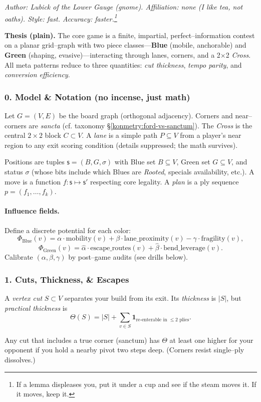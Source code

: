 \documentclass[11pt]{article}
\begin{document}
\begin{itemize}
\noindent\textit{Author: Lubick of the Lower Gauge (gnome). Affiliation: none (I like tea, not oaths). Style: fast. Accuracy: faster.\footnote{If a lemma displeases you, put it under a cup and see if the steam moves it. If it moves, keep it.}}

\medskip
\noindent\textbf{Thesis (plain).} The core game is a finite, impartial, perfect–information contest on a planar grid–graph with two piece classes—\textbf{Blue} (mobile, anchorable) and \textbf{Green} (shaping, evasive)—interacting through lanes, corners, and a 2\(\times\)2 \emph{Cross}. All meta patterns reduce to three quantities: \emph{cut thickness}, \emph{tempo parity}, and \emph{conversion efficiency}.

\subsubsection{0. Model \& Notation (no incense, just math)}
Let \(G=(V,E)\) be the board graph (orthogonal adjacency). Corners and near–corners are \emph{sancta} (cf. taxonomy \S\ref{konmetry:ford-vs-sanctum}). The \emph{Cross} is the central \(2\times2\) block \(C\subset V\). A \emph{lane} is a simple path \(P\subseteq V\) from a player’s near region to any exit scoring condition (details suppressed; the math survives). 

Positions are tuples \(\mathsf{s}=(B,G,\sigma)\) with Blue set \(B\subseteq V\), Green set \(G\subseteq V\), and status \(\sigma\) (whose bits include which Blues are \emph{Rooted}, specials availability, etc.). A move is a function \(f:\mathsf{s}\mapsto \mathsf{s}'\) respecting core legality. A \emph{plan} is a ply sequence \(p=(f_1,\dots,f_k)\).

\paragraph{Influence fields.} Define a discrete potential for each color:
\[
\Phi_{\text{Blue}}(v)= \alpha\cdot \text{mobility}(v) + \beta\cdot \text{lane\_proximity}(v) - \gamma\cdot \text{fragility}(v),
\]
\[
\Phi_{\text{Green}}(v)= \hat{\alpha}\cdot \text{escape\_routes}(v) + \hat{\beta}\cdot \text{bend\_leverage}(v).
\]
Calibrate \((\alpha,\beta,\gamma)\) by post–game audits (see drills below).

\subsubsection{1. Cuts, Thickness, \& Escapes}
\label{ael-core:cuts}
A \emph{vertex cut} \(S\subset V\) separates your build from its exit. Its \emph{thickness} is \(|S|\), but \emph{practical thickness} is 
\[
\Theta(S)= |S| + \sum_{v\in S}\mathbf{1}_{\text{re-enterable in }\le 2\text{ plies}}.
\]
\begin{lemma}
Any cut that includes a true corner (sanctum) has \(\Theta\) at least one higher for your opponent if you hold a nearby pivot two steps deep. (Corners resist single–ply dissolves.)
\end{lemma}


\end{itemize}
\end{document}
